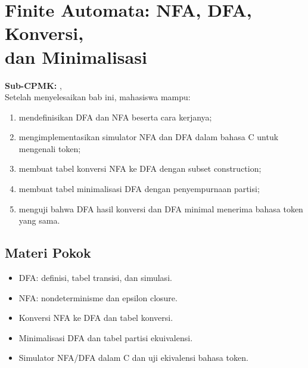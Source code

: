 \documentclass[../../main.tex]{subfiles}
\begin{document}
\chapter[Finite Automata]{Finite Automata: NFA, DFA, Konversi,\\ dan Minimalisasi}
\label{chap:finite-automata}

\begin{outcomebox}
\textbf{Sub-CPMK:} , \\[3pt]
Setelah menyelesaikan bab ini, mahasiswa mampu:
\begin{enumerate}[label=\arabic*.,leftmargin=*]
  \item mendefinisikan DFA dan NFA beserta cara kerjanya;
  \item mengimplementasikan simulator NFA dan DFA dalam bahasa C
        untuk mengenali token;
  \item membuat tabel konversi NFA ke DFA dengan subset construction;
  \item membuat tabel minimalisasi DFA dengan penyempurnaan partisi;
  \item menguji bahwa DFA hasil konversi dan DFA minimal menerima
        bahasa token yang sama.
\end{enumerate}
\end{outcomebox}

\section*{Materi Pokok}
\begin{itemize}[leftmargin=*]
  \item DFA: definisi, tabel transisi, dan simulasi.
  \item NFA: nondeterminisme dan epsilon closure.
  \item Konversi NFA ke DFA dan tabel konversi.
  \item Minimalisasi DFA dan tabel partisi ekuivalensi.
  \item Simulator NFA/DFA dalam C dan uji ekivalensi bahasa token.
\end{itemize}















\ifSubfilesClassLoaded{%
}{}
\end{document}
